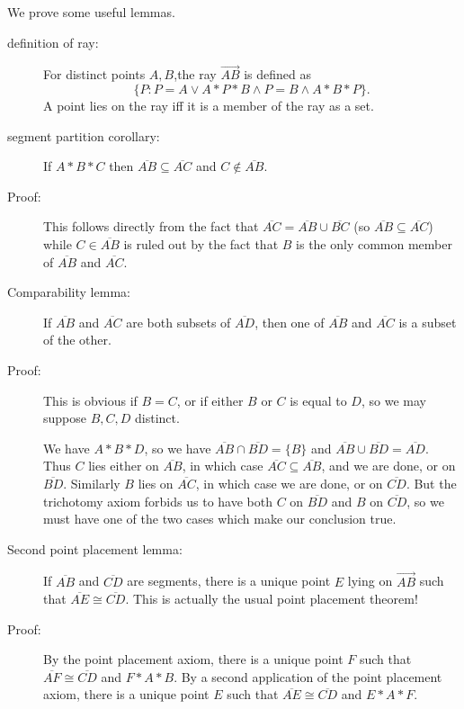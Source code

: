 \documentclass[12pt]{article}
\begin{document}
We prove some useful lemmas.

\begin{description}

\item[definition of ray:]  For distinct points $A,B$,the ray  $\overrightarrow{AB}$ is defined as $$\{P:P=A \vee A*P*B \wedge P=B \wedge A*B*P\}.$$  A point lies on the ray iff it is a member of the ray as a set.

\item[segment partition corollary:]  If $A*B*C$ then $\overline{AB} \subseteq \overline{AC}$ and $C \not\in \overline{AB}$.

\item[Proof:]  This follows directly from the fact that $\overline{AC} = \overline{AB} \cup \overline{BC}$ (so $\overline{AB} \subseteq \overline{AC}$) while
$C \in \overline{AB}$ is ruled out by the fact that $B$ is the only common member of $\overline{AB}$ and $\overline{AC}$.

\item[Comparability lemma:]  If $\overline{AB}$ and $\overline{AC}$ are both subsets of $\overline{AD}$, then one of $\overline{AB}$ and $\overline{AC}$ is a subset of the other.

\item[Proof:]  This is obvious if $B=C$, or if either $B$ or $C$ is equal to $D$, so we may suppose $B,C,D$ distinct.

We have $A*B*D$, so we have $\overline{AB} \cap \overline{BD} = \{B\}$ and $\overline{AB} \cup \overline{BD} = \overline{AD}$.  Thus $C$ lies
either on $\overline{AB}$, in which case $\overline{AC} \subseteq \overline{AB}$, and we are done, or on $\overline{BD}$.  Similarly $B$ lies on $\overline{AC}$, in which case we are done, or on $\overline{CD}$.  But the trichotomy axiom  forbids us to have both $C$ on $\overline{BD}$ and $B$ on $\overline{CD}$, so we must have one of the two cases which make our conclusion true.

\item[Second point placement lemma:]  If $\overline{AB}$ and $\overline{CD}$ are segments, there is a unique point $E$ lying  on $\overrightarrow{AB}$ such that $\overline{AE} \cong \overline{CD}$.  This is actually the usual point placement theorem!

\item[Proof:]  By the point placement axiom, there is a unique point $F$ such that $\overline{AF} \cong \overline{CD}$ and $F*A*B$.  By a second application of the
point placement axiom, there is a unique point $E$ such that $\overline{AE} \cong \overline{CD}$ and $E*A*F$.


\end{description}
\end{document}

